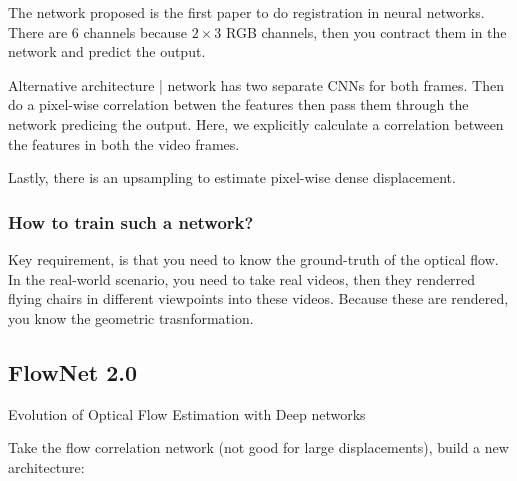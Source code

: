 \documentclass[11pt]{article}
\begin{document}
The network proposed is the first paper to do registration in neural networks. There are 6 channels because $2\times 3$ RGB channels, then you contract them in the network and predict the output. 

\begin{figure}[H]
    \centering
\end{figure}

Alternative architecture | network has two separate CNNs for both frames. Then do a pixel-wise correlation betwen the features then pass them through the network predicing the output. Here, we explicitly calculate a correlation between the features in both the video frames.

\begin{figure}[H]
    \centering
\end{figure}

Lastly, there is an upsampling to estimate pixel-wise dense displacement.

\subsubsection{How to train such a network?}

Key requirement, is that you need to know the ground-truth of the optical flow. In the real-world scenario, you need to take real videos, then they renderred flying chairs in different viewpoints into these videos. Because these are rendered, you know the geometric trasnformation.

\subsection{FlowNet 2.0}

Evolution of Optical Flow Estimation with Deep networks

\begin{figure}[H]
    \centering
\end{figure}

Take the flow correlation network (not good for large displacements), build a new architecture:
\end{document}
